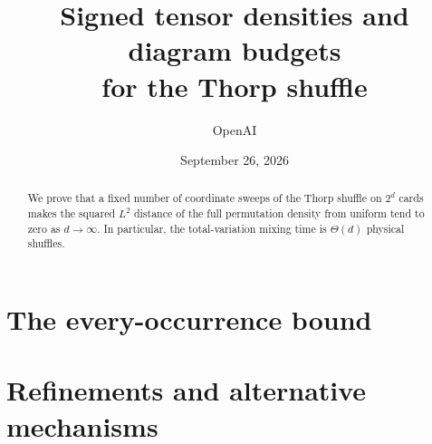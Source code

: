 \documentclass[11pt]{article}
\title{Signed tensor densities and diagram budgets\\for the Thorp shuffle}
\author{OpenAI}
\date{September 26, 2026}
\theoremstyle{definition}
\theoremstyle{remark}
\begin{document}
\maketitle
\begin{abstract}
We prove that a fixed number of coordinate sweeps of the Thorp shuffle on $2^d$ cards makes the squared $L^2$ distance of the full permutation density from uniform tend to zero as $d\to\infty$. In particular, the total-variation mixing time is $\Theta(d)$ physical shuffles.
\end{abstract}

\clearpage
\tableofcontents
\clearpage
\part{The every-occurrence bound}\label{part:every-occurrence}



\clearpage
\part{Refinements and alternative mechanisms}\label{part:refinements}








\begingroup
\raggedright
\setlength{\bibsep}{3pt}


\endgroup
\end{document}
